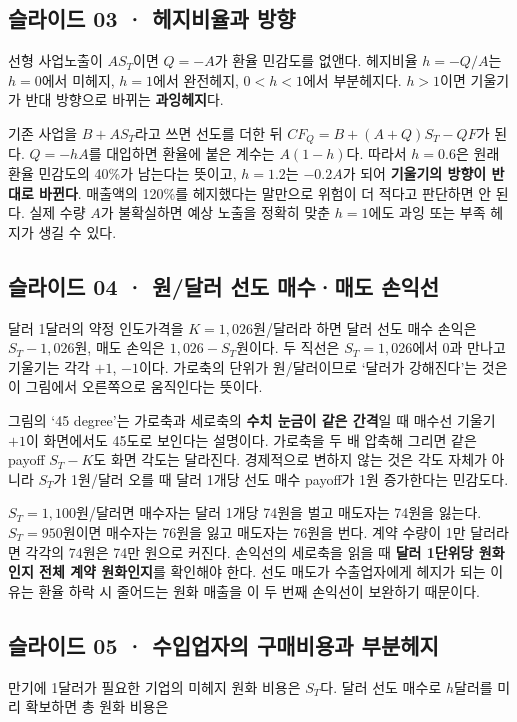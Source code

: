 \documentclass[11pt,a4paper]{article}
\begin{document}
\subsection{슬라이드 03 · 헤지비율과 방향}
선형 사업노출이 $AS_T$이면 $Q=-A$가 환율 민감도를 없앤다. 헤지비율 $h=-Q/A$는 $h=0$에서 미헤지, $h=1$에서 완전헤지, $0<h<1$에서 부분헤지다. $h>1$이면 기울기가 반대 방향으로 바뀌는 \textbf{과잉헤지}다.\par

기존 사업을 $B+AS_T$라고 쓰면 선도를 더한 뒤 $CF_Q=B+(A+Q)S_T-QF$가 된다. $Q=-hA$를 대입하면 환율에 붙은 계수는 $A(1-h)$다. 따라서 $h=0.6$은 원래 환율 민감도의 40\%가 남는다는 뜻이고, $h=1.2$는 $-0.2A$가 되어 \textbf{기울기의 방향이 반대로 바뀐다}. 매출액의 120\%를 헤지했다는 말만으로 위험이 더 적다고 판단하면 안 된다. 실제 수량 $A$가 불확실하면 예상 노출을 정확히 맞춘 $h=1$에도 과잉 또는 부족 헤지가 생길 수 있다.\par

\subsection{슬라이드 04 · 원/달러 선도 매수·매도 손익선}
달러 1달러의 약정 인도가격을 $K=1,026$원/달러라 하면 달러 선도 매수 손익은 $S_T-1,026$원, 매도 손익은 $1,026-S_T$원이다. 두 직선은 $S_T=1,026$에서 0과 만나고 기울기는 각각 $+1$, $-1$이다. 가로축의 단위가 원/달러이므로 ‘달러가 강해진다’는 것은 이 그림에서 오른쪽으로 움직인다는 뜻이다.\par

그림의 ‘45 degree’는 가로축과 세로축의 \textbf{수치 눈금이 같은 간격}일 때 매수선 기울기 $+1$이 화면에서도 45도로 보인다는 설명이다. 가로축을 두 배 압축해 그리면 같은 payoff $S_T-K$도 화면 각도는 달라진다. 경제적으로 변하지 않는 것은 각도 자체가 아니라 $S_T$가 1원/달러 오를 때 달러 1개당 선도 매수 payoff가 1원 증가한다는 민감도다.\par

$S_T=1{,}100$원/달러면 매수자는 달러 1개당 74원을 벌고 매도자는 74원을 잃는다. $S_T=950$원이면 매수자는 76원을 잃고 매도자는 76원을 번다. 계약 수량이 1만 달러라면 각각의 74원은 74만 원으로 커진다. 손익선의 세로축을 읽을 때 \textbf{달러 1단위당 원화인지 전체 계약 원화인지}를 확인해야 한다. 선도 매도가 수출업자에게 헤지가 되는 이유는 환율 하락 시 줄어드는 원화 매출을 이 두 번째 손익선이 보완하기 때문이다.\par

\subsection{슬라이드 05 · 수입업자의 구매비용과 부분헤지}
만기에 1달러가 필요한 기업의 미헤지 원화 비용은 $S_T$다. 달러 선도 매수로 $h$달러를 미리 확보하면 총 원화 비용은\par
\end{document}

